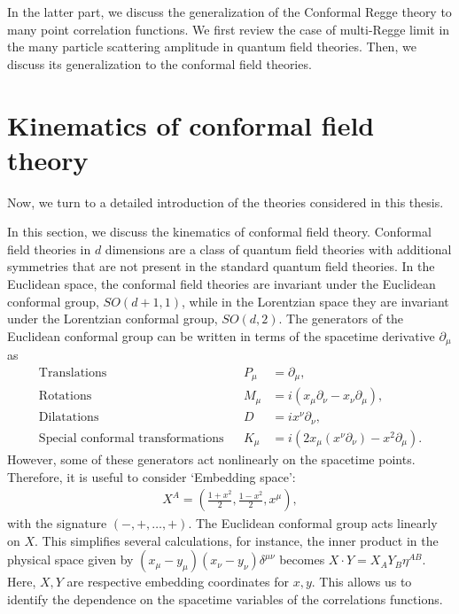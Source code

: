 In the latter part, we discuss the generalization of the Conformal Regge theory to many point correlation functions.
We first review the case of multi-Regge limit in the many particle scattering amplitude in quantum field theories.
Then, we discuss its generalization to the conformal field theories.


\section{Kinematics of conformal field theory}
Now, we turn to a detailed introduction of the theories considered in this thesis.

In this section, we discuss the kinematics of conformal field theory.
Conformal field theories in $ d $ dimensions are a class of quantum field theories with additional symmetries that are not present in the standard quantum field theories.
In the Euclidean space, the conformal field theories are invariant under the Euclidean conformal group, $ SO(d+1,1) $, while in the Lorentzian space they are invariant under the Lorentzian conformal group, $ SO(d,2) $.
The generators of the Euclidean conformal group can be written in terms of the spacetime derivative $ \partial_{\mu} $ as
\begin{align}
  \text{Translations}                      &  & P_{\mu} & = \partial_{\mu}                                                            ,  \\
  \text{Rotations}                         &  & M_{\mu} & =  i\left( x_\mu \partial_\nu - x_\nu \partial_\mu \right)                   , \\
  \text{Dilatations}                       &  & D       & = i x^\nu \partial_\nu                                                       , \\
  \text{Special conformal transformations} &  & K_{\mu} & = i\left( 2x_\mu \left( x^\nu \partial_\nu \right) -x^2 \partial_\mu \right)
  .
\end{align}
However, some of these generators act nonlinearly on the spacetime points.
Therefore, it is useful to consider `Embedding space':
\begin{align}
  X^A = \left( \frac{1+x^2}{2},\frac{1-x^2}{2},x^\mu  \right)  ,
\end{align}
with the signature $ \left( -,+,\dots,+ \right) $.
The Euclidean conformal group acts linearly on $ X $.
This simplifies several calculations, for instance, the inner product in the physical space given by  $ \left( x_\mu -y_\mu \right) \left( x_\nu - y_\nu \right) \delta^{\mu\nu} $ becomes $ X\cdot Y =X_A Y_B \eta^{A B} $.
Here, $ X,Y $ are respective embedding coordinates for $ x,y $.
This allows us to identify the dependence on the spacetime variables of the correlations functions.

